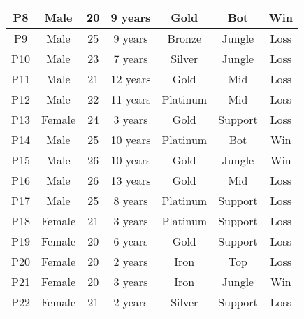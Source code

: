 \begin{table*}
\begin{tabular}{c|c|c|c|c|c|c}
\hline
P8          & Male            & 20           & 9 years             & Gold                    & Bot                  & Win                    \\ 
\hline
P9          & Male            & 25           & 9 years             & Bronze                  & Jungle               & Loss                   \\ 
\hline
P10         & Male            & 23           & 7 years             & Silver                  & Jungle               & Loss                   \\ 
\hline
P11         & Male            & 21           & 12 years            & Gold                    & Mid                  & Loss                   \\ 
\hline
P12         & Male            & 22           & 11 years            & Platinum                & Mid                  & Loss                   \\ 
\hline
P13         & Female          & 24           & 3 years             & Gold                    & Support              & Loss                   \\ 
\hline
P14         & Male            & 25           & 10 years            & Platinum                & Bot                  & Win                    \\ 
\hline
P15         & Male            & 26           & 10 years            & Gold                    & Jungle               & Win                    \\ 
\hline
P16         & Male            & 26           & 13 years            & Gold                    & Mid                  & Loss                   \\ 
\hline
P17         & Male            & 25           & 8 years             & Platinum                & Support              & Loss                   \\
\hline
P18         & Female            & 21           & 3 years             & Platinum                & Support              & Loss                   \\
\hline
P19         & Female            & 20           & 6 years             & Gold                & Support              & Loss                   \\
\hline
P20         & Female            & 20           & 2 years             & Iron                & Top              & Loss                   \\
\hline
P21         & Female            & 20           & 3 years             & Iron                & Jungle              & Win                   \\
\hline
P22         & Female            & 21           & 2 years             & Silver                & Support              & Loss                   \\
\bottomrule
\end{tabular}
\end{table*}

